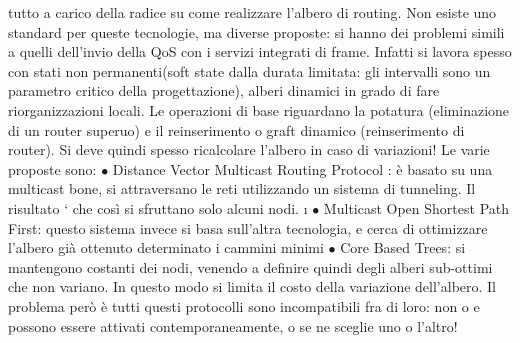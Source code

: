 tutto a carico della radice su come realizzare l'albero di routing.
Non esiste uno standard per queste tecnologie, ma diverse proposte: si hanno
dei problemi simili a quelli dell'invio della QoS con i servizi integrati di frame.
Infatti si lavora spesso con stati non permanenti(soft state dalla durata limitata:
gli intervalli sono un parametro critico della progettazione), alberi dinamici
in grado di fare riorganizzazioni locali. Le operazioni di base riguardano la
potatura (eliminazione di un router superuo) e il reinserimento o graft dinamico
(reinserimento di router). Si deve quindi spesso ricalcolare l'albero in caso di
variazioni! Le varie proposte sono:
$\bullet$ Distance Vector Multicast Routing Protocol : è basato su una multicast
bone, si attraversano le reti utilizzando un sistema di tunneling. Il risultato
` che così si sfruttano solo alcuni nodi.
\i{}
$\bullet$ Multicast Open Shortest Path First: questo sistema invece si basa sull'altra tecnologia, e cerca di
ottimizzare l'albero già ottenuto determinato i
cammini minimi
$\bullet$ Core Based Trees: si mantengono costanti dei nodi, venendo a definire
quindi degli alberi sub-ottimi che non variano. In questo modo si limita il
costo della variazione dell'albero.
Il problema però è tutti questi protocolli sono incompatibili fra di loro: non
o e
possono essere attivati contemporaneamente, o se ne sceglie uno o l'altro!
